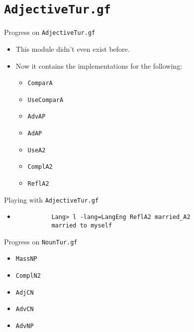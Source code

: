 \documentclass{beamer}
\begin{document}
  \section{\texttt{AdjectiveTur.gf}}

  \begin{frame}{Progress on \texttt{AdjectiveTur.gf}}
    \begin{itemize}
      \item<1-> This module didn't even exist before.
      \item<2-> Now it contains the implementations for the following:
        \begin{itemize}
          \item \texttt{ComparA}
          \item \texttt{UseComparA}
          \item \texttt{AdvAP}
          \item \texttt{AdAP}
          \item \texttt{UseA2}
          \item \texttt{ComplA2}
          \item \texttt{ReflA2}
        \end{itemize}
    \end{itemize}
  \end{frame}

  \begin{frame}[fragile]{Playing with \texttt{AdjectiveTur.gf}}
    \begin{itemize}
      \item<1->
        \begin{lstlisting}
          Lang> l -lang=LangEng ReflA2 married_A2
          married to myself
        \end{lstlisting}
    \end{itemize}
  \end{frame}

  \begin{frame}{Progress on \texttt{NounTur.gf}}
    \begin{itemize}
      \item \texttt{MassNP}
      \item \texttt{ComplN2}
      \item \texttt{AdjCN}
      \item \texttt{AdvCN}
      \item \texttt{AdvNP}
    \end{itemize}
  \end{frame}
\end{document}
